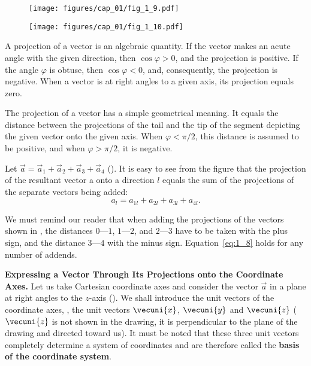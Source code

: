 \begin{figure}[t]
	\begin{minipage}[t]{0.5\linewidth}
		\begin{center}
			\texttt{[image: figures/cap\_01/fig\_1\_9.pdf]}
			\caption[]{}
			\label{fig:1_9}
		\end{center}
	\end{minipage}
	\hfill{ }%
	\begin{minipage}[t]{0.5\linewidth}
		\begin{center}
			\texttt{[image: figures/cap\_01/fig\_1\_10.pdf]}
			\caption[]{}
			\label{fig:1_10}
		\end{center}
	\end{minipage}
	\vspace{-0.7cm}
\end{figure}

A projection of a vector is an algebraic quantity. If the vector makes an acute angle with the given direction, then $\cos\varphi>0$, and the projection is positive. If the angle $\varphi$ is obtuse, then $\cos\varphi<0$, and, consequently, the projection is negative. When a vector is at right angles to a given axis, its projection equals zero.

The projection of a vector has a simple geometrical meaning. It equals the distance between the projections of the tail and the tip of the segment depicting the given vector onto the given axis. When $\varphi<\pi/2$, this distance is assumed to be positive, and when $\varphi>\pi/2$, it is negative.

Let $\vec{a} = \vec{a}_1+\vec{a}_2+\vec{a}_3+\vec{a}_4$ (). It is easy to see from the figure that the projection of the resultant vector a onto a direction $l$ equals the sum of the projections of the separate vectors being added:
\begin{equation}\label{eq:1_8}
a_l = a_{1l}+a_{2l}+a_{3l}+a_{4l}.
\end{equation}

\noindent
We must remind our reader that when adding the projections of the vectors shown in , the distances $0$---$1$, $1$---$2$, and $2$---$3$ have to be taken with the plus sign, and the distance $3$---$4$ with the minus sign. Equation~\eqref{eq:1_8} holds for any number of addends.

\textbf{Expressing a Vector Through Its Projections onto the Coordinate Axes.} Let us take Cartesian coordinate axes and consider the vector $\vec{a}$ in a plane at right angles to the $z$-axis (). We shall introduce the unit vectors of the coordinate axes, \ie, the unit vectors $\vecuni{x}$, $\vecuni{y}$ and $\vecuni{z}$ ($\vecuni{z}$ is not shown in the drawing, it is perpendicular to the plane of the drawing and directed toward us). It must be noted that these three unit vectors completely determine a system of coordinates and are therefore called the \textbf{basis of the coordinate system}.

